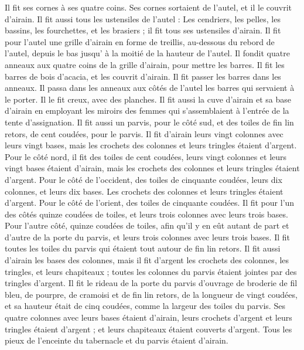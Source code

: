 \begin{multicols}{2}
Il fit ses cornes à ses quatre coins. Ses cornes sortaient de l’autel, et il le couvrit d'airain.
Il fit aussi tous les ustensiles de l'autel : Les cendriers, les pelles, les bassins, les fourchettes, et les brasiers ; il fit tous ses ustensiles d'airain.
Il fit pour l'autel une grille d'airain en forme de treillis, au-dessous du rebord de l'autel, depuis le bas jusqu’ à la moitié de la hauteur de l’autel.
Il fondit quatre anneaux aux quatre coins de la grille d'airain, pour mettre les barres.
Il fit les barres de bois d’acacia, et les couvrit d'airain.
Il fit passer les barres dans les anneaux. Il passa dans les anneaux aux côtés de l’autel les barres qui servaient à le porter. Il le fit creux, avec des planches.
Il fit aussi la cuve d'airain et sa base d'airain en employant les miroirs des femmes qui s’assemblaient à l’entrée de la tente d'assignation.
Il fit aussi un parvis, pour le côté sud, et des toiles de fin lin retors, de cent coudées, pour le parvis.
Il fit d'airain leurs vingt colonnes avec leurs vingt bases, mais les crochets des colonnes et leurs tringles étaient d'argent.
Pour le côté nord, il fit des toiles de cent coudées, leurs vingt colonnes et leurs vingt bases étaient d'airain, mais les crochets des colonnes et leurs tringles étaient d'argent.
Pour le côté de l'occident, des toiles de cinquante coudées, leurs dix colonnes, et leurs dix bases. Les crochets des colonnes et leurs tringles étaient d'argent.
Pour le côté de l'orient, des toiles de cinquante coudées.
Il fit pour l'un des côtés quinze coudées de toiles, et leurs trois colonnes avec leurs trois bases.
Pour l'autre côté, quinze coudées de toiles, afin qu'il y en eût autant de part et d’autre de la porte du parvis, et leurs trois colonnes avec leurs trois bases.
Il fit toutes les toiles du parvis qui étaient tout autour de fin lin retors.
Il fit aussi d'airain les bases des colonnes, mais il fit d'argent les crochets des colonnes, les tringles, et leurs chapiteaux ; toutes les colonnes du parvis étaient jointes par des tringles d’argent.
Il fit le rideau de la porte du parvis d'ouvrage de broderie de fil bleu, de pourpre, de cramoisi et de fin lin retors, de la longueur de vingt coudées, et sa hauteur était de cinq coudées, comme la largeur des toiles du parvis.
Ses quatre colonnes avec leurs bases étaient d'airain, leurs crochets d'argent et leurs tringles étaient d’argent ; et leurs chapiteaux étaient couverts d'argent.
Tous les pieux de l’enceinte du tabernacle et du parvis étaient d'airain.

\end{multicols}

